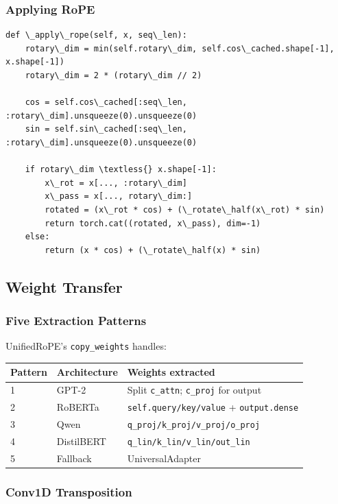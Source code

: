 \subsubsection{Applying RoPE}

\begin{lstlisting}
def \_apply\_rope(self, x, seq\_len):
    rotary\_dim = min(self.rotary\_dim, self.cos\_cached.shape[-1], x.shape[-1])
    rotary\_dim = 2 * (rotary\_dim // 2)
    
    cos = self.cos\_cached[:seq\_len, :rotary\_dim].unsqueeze(0).unsqueeze(0)
    sin = self.sin\_cached[:seq\_len, :rotary\_dim].unsqueeze(0).unsqueeze(0)
    
    if rotary\_dim \textless{} x.shape[-1]:
        x\_rot = x[..., :rotary\_dim]
        x\_pass = x[..., rotary\_dim:]
        rotated = (x\_rot * cos) + (\_rotate\_half(x\_rot) * sin)
        return torch.cat((rotated, x\_pass), dim=-1)
    else:
        return (x * cos) + (\_rotate\_half(x) * sin)
\end{lstlisting}

\subsection{Weight Transfer}

\subsubsection{Five Extraction Patterns}

UnifiedRoPE's \texttt{copy\_weights} handles:

\begin{table}[H]
\centering
\small
\begin{tabular}{lll}
\toprule
\textbf{Pattern} & \textbf{Architecture} & \textbf{Weights extracted} \\
\midrule
1 & GPT-2 & Split \texttt{c\_attn}; \texttt{c\_proj} for output \\
2 & RoBERTa & \texttt{self.query/key/value} + \texttt{output.dense} \\
3 & Qwen & \texttt{q\_proj/k\_proj/v\_proj/o\_proj} \\
4 & DistilBERT & \texttt{q\_lin/k\_lin/v\_lin/out\_lin} \\
5 & Fallback & UniversalAdapter \\
\bottomrule
\end{tabular}
\end{table}

\subsubsection{Conv1D Transposition}

